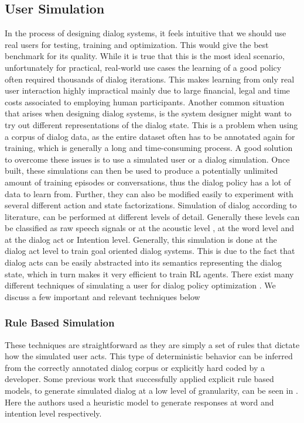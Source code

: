 \documentclass[12pt]{extarticle}
\numberwithin{equation}{section}
\begin{document}
	\subsection{User Simulation}
	In the process of designing dialog systems, it feels intuitive that we should use real users for testing, training and optimization. This would give the best benchmark for its quality. While it is true that this is the most ideal scenario, unfortunately for practical, real-world use cases the learning of a good policy often required thousands of dialog iterations. This makes learning from only real user interaction highly impractical mainly due to large financial, legal and time costs associated to employing human participants. Another common situation that arises when designing dialog systems, is the system designer might want to try out different representations of the dialog state. This is a problem when using a corpus of dialog data, as the entire dataset often has to be annotated again for training, which is generally a long and time-consuming process. A good solution to overcome these issues is to use a simulated user or a dialog simulation. Once built, these simulations can then be used to produce a potentially unlimited amount of training episodes or conversations, thus the dialog policy has a lot of data to learn from. Further, they can also be modified easily to experiment with several different action and state factorizations.
	Simulation of dialog according to literature, can be performed at different levels of detail. Generally these levels can be classified as raw speech signals or at the acoustic level \cite{lopez-cozar-simulation}, at the word level and at the dialog act or Intention level. Generally, this simulation is done at the dialog act level to train goal oriented dialog systems. This is due to the fact that dialog acts can be easily abstracted into its semantics representing the dialog state, which in turn makes it very efficient to train RL agents.
	There exist many different techniques of simulating a user for dialog policy optimization \cite{Schatzmann_stat_user_sim}. We discuss a few important and relevant techniques below
	\subsubsection{Rule Based Simulation}	
	These techniques are straightforward as they are simply a set of rules that dictate how the simulated user acts. This type of deterministic behavior can be inferred from the correctly annotated dialog corpus or explicitly hard coded by a developer. Some previous work that successfully applied explicit rule based models, to generate simulated dialog at a low level of granularity, can be seen in  \cite{Chung_user_sim}\cite{Lopez-Cozar_user-sim}. Here the authors used a heuristic model to generate responses at word and intention level respectively.
\end{document}
